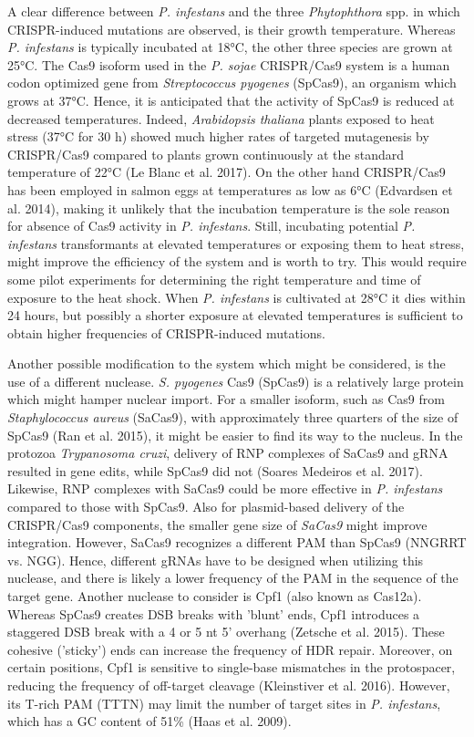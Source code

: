 \documentclass[onecolumn, 11pt,openany]{memoir}
\begin{document}
\begin{multicols}{2}
A clear difference between \textit{P. infestans} and the three \textit{Phytophthora} spp. in which CRISPR-induced mutations are observed, is their growth temperature. Whereas \textit{P. infestans} is typically incubated at 18°C, the other three species are grown at 25°C. The Cas9 isoform used in the \textit{P. sojae} CRISPR/Cas9 system is a human codon optimized gene from \textit{Streptococcus pyogenes }(SpCas9), an organism which grows at 37°C. Hence, it is anticipated that the activity of SpCas9 is reduced at decreased temperatures. Indeed, \textit{Arabidopsis thaliana} plants exposed to heat stress (37°C for 30 h) showed much higher rates of targeted mutagenesis by CRISPR/Cas9 compared to plants grown continuously at the standard temperature of 22°C (Le Blanc et al. 2017). On the other hand CRISPR/Cas9 has been employed in salmon eggs at temperatures as low as 6°C (Edvardsen et al. 2014), making it unlikely that the incubation temperature is the sole reason for absence of Cas9 activity in \textit{P. infestans}. Still, incubating potential \textit{P. infestans} transformants at elevated temperatures or exposing them to heat stress, might improve the efficiency of the system and is worth to try. This would require some pilot experiments for determining the right temperature and time of exposure to the heat shock. When \textit{P. infestans }is cultivated at 28°C it dies within 24 hours, but possibly a shorter exposure at elevated temperatures is sufficient to obtain higher frequencies of CRISPR-induced mutations. 

Another possible modification to the system which might be considered, is the use of a different nuclease. \textit{S. pyogenes} Cas9 (SpCas9) is a relatively large protein which might hamper nuclear import. For a smaller isoform, such as Cas9 from \textit{Staphylococcus aureus} (SaCas9), with approximately three quarters of the size of SpCas9 (Ran et al. 2015), it might be easier to find its way to the nucleus. In the protozoa \textit{Trypanosoma cruzi}, delivery of RNP complexes of SaCas9 and gRNA resulted in gene edits, while SpCas9 did not (Soares Medeiros et al. 2017). Likewise, RNP complexes with SaCas9 could be more effective in \textit{P. infestans }compared to those with SpCas9. Also for plasmid-based delivery of the CRISPR/Cas9 components, the smaller gene size of \textit{SaCas9} might improve integration. However, SaCas9 recognizes a different PAM than SpCas9 (NNGRRT vs. NGG). Hence, different gRNAs have to be designed when utilizing this nuclease, and there is likely a lower frequency of the PAM in the sequence of the target gene. Another nuclease to consider is Cpf1 (also known as Cas12a). Whereas SpCas9 creates DSB breaks with 'blunt' ends, Cpf1 introduces a staggered DSB break with a 4 or 5 nt 5' overhang (Zetsche et al. 2015). These cohesive ('sticky') ends can increase the frequency of HDR repair. Moreover, on certain positions, Cpf1 is sensitive to single-base mismatches in the protospacer, reducing the frequency of off-target cleavage (Kleinstiver et al. 2016). However, its T-rich PAM (TTTN) may limit the number of target sites in \textit{P. infestans}, which has a GC content of 51\% (Haas et al. 2009).


\end{multicols}
\end{document}
